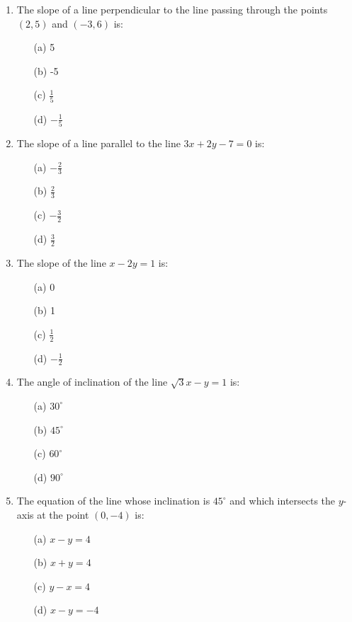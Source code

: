 \documentclass[12pt]{article}
\begin{document}
\begin{multicols}{2}
\begin{enumerate}
	\item The slope of a line perpendicular to the line passing through the points \( (2, 5) \) and \( (-3, 6) \) is:
	\begin{itemize}
		\item[(a)] 5
		\item[(b)] -5
		\item[(c)] \( \frac{1}{5} \)
		\item[(d)] \( -\frac{1}{5} \)
	\end{itemize}
	
	\item The slope of a line parallel to the line \( 3x + 2y - 7 = 0 \) is:
	\begin{itemize}
		\item[(a)] \( -\frac{2}{3} \)
		\item[(b)] \( \frac{2}{3} \)
		\item[(c)] \( -\frac{3}{2} \)
		\item[(d)] \( \frac{3}{2} \)
	\end{itemize}
	
	\item The slope of the line \( x - 2y = 1 \) is:
	\begin{itemize}
		\item[(a)] 0
		\item[(b)] 1
		\item[(c)] \( \frac{1}{2} \)
		\item[(d)] \( -\frac{1}{2} \)
	\end{itemize}
	
	\item The angle of inclination of the line \( \sqrt{3}x - y = 1 \) is:
	\begin{itemize}
		\item[(a)] \( 30^\circ \)
		\item[(b)] \( 45^\circ \)
		\item[(c)] \( 60^\circ \)
		\item[(d)] \( 90^\circ \)
	\end{itemize}
	
	\item The equation of the line whose inclination is \( 45^\circ \) and which intersects the \( y \)-axis at the point \( (0, -4) \) is:
	\begin{itemize}
		\item[(a)] \( x - y = 4 \)
		\item[(b)] \( x + y = 4 \)
		\item[(c)] \( y - x = 4 \)
		\item[(d)] \( x - y = -4 \)
	\end{itemize}
	

\end{enumerate}
\end{multicols}
\end{document}
